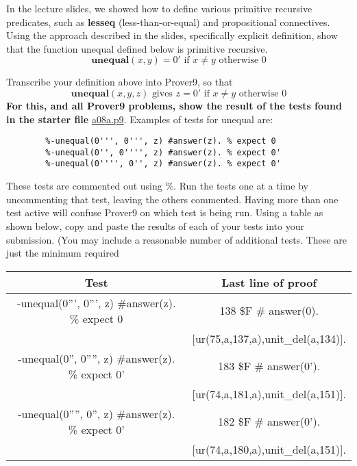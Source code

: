 \documentclass[12pt,hidelinks,letterpaper,boxed,cm]{hmcpset}
\newcommand{\tb}[1]{\textbf{#1}}
\renewcommand{\t}[1]{\text{#1}}
\begin{document}

\begin{problem}[1.]
    [1 point] In the lecture slides, we showed how to define various primitive recursive predicates, such as \tb{lesseq} (less-than-or-equal) and propositional connectives.\\
    Using the approach described in the slides, specifically explicit definition, show that the function unequal defined below is primitive recursive.
    \[
        \tb{unequal}(x, y) = 0' \t{ if } x \ne y \t{ otherwise } 0
    \]
\end{problem}

\begin{solution}
    \vfill
\end{solution}
\newpage

\begin{problem}[2.]
    [1 point] Transcribe your definition above into Prover9, so that
    \[
        \tb{unequal}(x, y, z) \t{ gives } z = 0' \t{ if } x \ne y \t{ otherwise } 0
    \]
    \tb{For this, and all Prover9 problems, show the result of the tests found in the starter file} \href{https://docs.google.com/document/d/17TpS3azVV9630p24oeJrzMXScU_wvS9LOdKpn7Ox6nI/edit}{a08a.p9}. Examples of tests for unequal are:
    \begin{lstlisting}
        %-unequal(0''', 0''', z) #answer(z). % expect 0
        %-unequal(0'', 0'''', z) #answer(z). % expect 0'
        %-unequal(0'''', 0'', z) #answer(z). % expect 0'
    \end{lstlisting}
    These tests are commented out using \%. Run the tests one at a time by uncommenting that test, leaving the others commented. Having more than one test active will confuse Prover9 on which test is being run. Using a table as shown below, copy and paste the results of each of your tests into your submission. (You may include a reasonable number of additional tests. These are just the minimum required
    \begin{center}
        \begin{tabular}{| c | c |}
            \hline
            \tb{Test} & \tb{Last line of proof} \\
            \hline
            -unequal(0''', 0''', z) \#answer(z). \% expect 0 
            & 138 \$F \# answer(0). \\ &
            [ur(75,a,137,a),unit\_del(a,134)]. \\
            \hline
            -unequal(0'', 0'''', z) \#answer(z). \% expect 0'
            & 183 \$F \# answer(0').\\ &
            [ur(74,a,181,a),unit\_del(a,151)]. \\
            \hline
            -unequal(0'''', 0'', z) \#answer(z). \% expect 0'
            & 182 \$F \# answer(0').\\ &
            [ur(74,a,180,a),unit\_del(a,151)].\\
            \hline
        \end{tabular}
    \end{center}
\end{problem}
\end{document}
